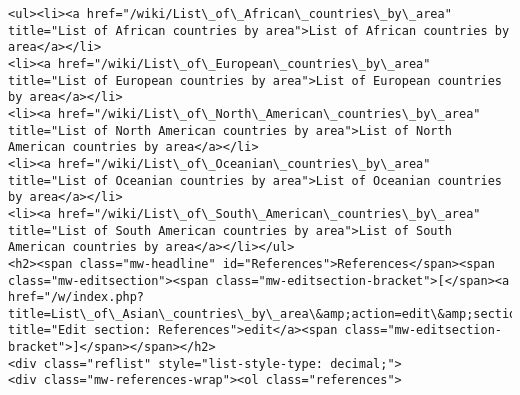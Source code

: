 \documentclass[11pt]{article}
\begin{document}
\begin{Verbatim}[commandchars=\\\{\}]
<ul><li><a href="/wiki/List\_of\_African\_countries\_by\_area" title="List of African countries by area">List of African countries by area</a></li>
<li><a href="/wiki/List\_of\_European\_countries\_by\_area" title="List of European countries by area">List of European countries by area</a></li>
<li><a href="/wiki/List\_of\_North\_American\_countries\_by\_area" title="List of North American countries by area">List of North American countries by area</a></li>
<li><a href="/wiki/List\_of\_Oceanian\_countries\_by\_area" title="List of Oceanian countries by area">List of Oceanian countries by area</a></li>
<li><a href="/wiki/List\_of\_South\_American\_countries\_by\_area" title="List of South American countries by area">List of South American countries by area</a></li></ul>
<h2><span class="mw-headline" id="References">References</span><span class="mw-editsection"><span class="mw-editsection-bracket">[</span><a href="/w/index.php?title=List\_of\_Asian\_countries\_by\_area\&amp;action=edit\&amp;section=2" title="Edit section: References">edit</a><span class="mw-editsection-bracket">]</span></span></h2>
<div class="reflist" style="list-style-type: decimal;">
<div class="mw-references-wrap"><ol class="references">

\end{Verbatim}
\end{document}
